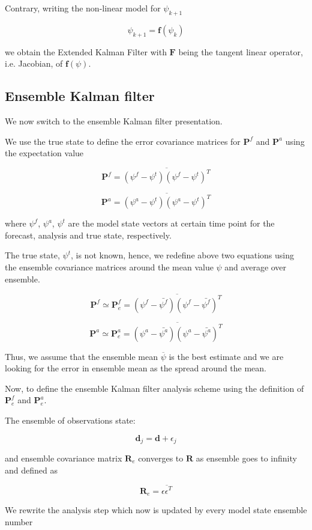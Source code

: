 \documentclass[a4,12pt]{article}
\begin{document}
Contrary, writing the non-linear model for $\psi_{k+1}$

$$\psi_{k+1}=\textbf{f}(\psi_{k})$$

we obtain the Extended Kalman Filter with $\textbf{F}$ being the tangent linear operator, i.e. Jacobian, of $\textbf{f}(\psi)$.

\subsection{Ensemble Kalman filter}
We now switch to the ensemble Kalman filter presentation.

We use the true state to define the error covariance matrices for $\textbf{P}^{f}$ and $\textbf{P}^{a}$ using the expectation value 

$$\textbf{P}^{f} = \overline{(\psi^{f}-\psi^{t})(\psi^{f}-\psi^{t})^{T}}$$

$$\textbf{P}^{a} = \overline{(\psi^{a}-\psi^{t})(\psi^{a}-\psi^{t})^{T}}$$

where $\psi ^{f}$, $\psi ^{a}$, $\psi ^{t}$ are the model state vectors at certain time point for the forecast, analysis and true state, respectively.

The true state, $\psi ^{t}$, is not known, hence, we redefine above two equations using the ensemble covariance matrices around the mean value $\psi$ and average over ensemble. 

$$\textbf{P}^{f} \simeq \textbf{P}^{f}_{e} = \overline{(\psi^{f}-\bar{\psi^{f}})(\psi^{f}-\bar{\psi^{f}})^{T}}$$

$$\textbf{P}^{a} \simeq \textbf{P}^{a}_{e}= \overline{ (\psi^{a}-\bar {\psi^{a}})(\psi^{a}-\bar{\psi^{a}})^{T} }$$

Thus, we assume that the ensemble mean $\overline {\psi}$ is the best estimate  and we are looking for the error in ensemble mean as the spread around the mean.

Now, to define the ensemble Kalman filter analysis scheme using the definition of $\textbf{P}^{f}_{e}$ and $\textbf{P}^{a}_{e}$.

The ensemble of observations state:

$$\textbf{d}_{j} = \textbf{d} + \epsilon_{j}$$

and ensemble covariance matrix $\textbf{R}_{e}$ converges to $\textbf{R}$ as ensemble goes to infinity and defined as 

$$\textbf{R}_{e} = \overline{\epsilon \epsilon ^{T}}$$

We rewrite the analysis step which now is updated by every model state ensemble number
\end{document}
